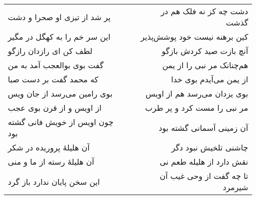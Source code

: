 \begin{center}
\begin{longtable}{l p{0.5cm} r}
پر شد از تیزی او صحرا و دشت
&&
دشت چه کز نه فلک هم در گذشت
\\
این سر خم را به کهگل در مگیر
&&
کین برهنه نیست خود پوشش‌پذیر
\\
لطف کن ای رازدان رازگو
&&
آنچ بازت صید کردش بازگو
\\
گفت بوی بوالعجب آمد به من
&&
هم‌چنانک مر نبی را از یمن
\\
که محمد گفت بر دست صبا
&&
از یمن می‌آیدم بوی خدا
\\
بوی رامین می‌رسد از جان ویس
&&
بوی یزدان می‌رسد هم از اویس
\\
از اویس و از قرن بوی عجب
&&
مر نبی را مست کرد و پر طرب
\\
چون اویس از خویش فانی گشته بود
&&
آن زمینی آسمانی گشته بود
\\
آن هلیلهٔ پروریده در شکر
&&
چاشنی تلخیش نبود دگر
\\
آن هلیلهٔ رسته از ما و منی
&&
نقش دارد از هلیله طعم نی
\\
این سخن پایان ندارد باز گرد
&&
تا چه گفت از وحی غیب آن شیرمرد
\\
\end{longtable}
\end{center}
